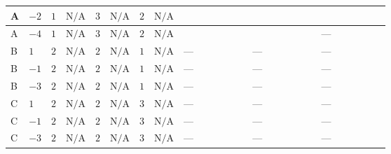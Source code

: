 \documentclass[8pt]{article}
\begin{document}
\begin{landscape}
\begin{longtable}{@{}llcccccc >{\raggedright\arraybackslash}p{0.21\linewidth} >{\raggedright\arraybackslash}p{0.21\linewidth} >{\raggedright\arraybackslash}p{0.21\linewidth}@{}}
\midrule
A & $-2$ & $1$ & $\text{N/A}$ & $3$ & $\text{N/A}$ & $2$ & $\text{N/A}$ & \scriptsize\adjustbox{max width=\linewidth}{$\begin{gathered} {\lambda_{HS_2}^{(A)}} (6 \operatorname{Tr}\!\left({Y_d}\,\left({Y_d}\right)^{\dagger}\right)+2 \operatorname{Tr}\!\left({Y_e}\,\left({Y_e}\right)^{\dagger}\right)+6 \operatorname{Tr}\!\left({Y_u}\,\left({Y_u}\right)^{\dagger}\right)+16 {\lambda_{S_2}^{(A)}})\end{gathered}$} & \scriptsize\adjustbox{max width=\linewidth}{$\begin{gathered} +\frac{8}{3} {\lambda_5} \left({\lambda_5}\right)^{*}\end{gathered}$} & \scriptsize\adjustbox{max width=\linewidth}{$\begin{gathered} -\frac{8}{3} {\lambda_{X_{12}}} \left({\lambda_{X_{12}}}\right)^{*}\end{gathered}$} \\
\midrule
A & $-4$ & $1$ & $\text{N/A}$ & $3$ & $\text{N/A}$ & $2$ & $\text{N/A}$ & \scriptsize\adjustbox{max width=\linewidth}{$\begin{gathered} {\lambda_{HS_2}^{(A)}} (6 \operatorname{Tr}\!\left({Y_d}\,\left({Y_d}\right)^{\dagger}\right)+2 \operatorname{Tr}\!\left({Y_e}\,\left({Y_e}\right)^{\dagger}\right)+6 \operatorname{Tr}\!\left({Y_u}\,\left({Y_u}\right)^{\dagger}\right)+16 {\lambda_{S_2}^{(A)}})\end{gathered}$} & \scriptsize\adjustbox{max width=\linewidth}{$\begin{gathered} +\frac{8}{3} {\lambda_5} \left({\lambda_5}\right)^{*}\end{gathered}$} & --- \\
\midrule
B & $1$ & $2$ & $\text{N/A}$ & $2$ & $\text{N/A}$ & $1$ & $\text{N/A}$ & --- & --- & --- \\
\midrule
B & $-1$ & $2$ & $\text{N/A}$ & $2$ & $\text{N/A}$ & $1$ & $\text{N/A}$ & --- & --- & --- \\
\midrule
B & $-3$ & $2$ & $\text{N/A}$ & $2$ & $\text{N/A}$ & $1$ & $\text{N/A}$ & --- & --- & --- \\
\midrule
C & $1$ & $2$ & $\text{N/A}$ & $2$ & $\text{N/A}$ & $3$ & $\text{N/A}$ & --- & --- & --- \\
\midrule
C & $-1$ & $2$ & $\text{N/A}$ & $2$ & $\text{N/A}$ & $3$ & $\text{N/A}$ & --- & --- & --- \\
\midrule
C & $-3$ & $2$ & $\text{N/A}$ & $2$ & $\text{N/A}$ & $3$ & $\text{N/A}$ & --- & --- & --- \\

\end{longtable}
\end{landscape}
\end{document}
